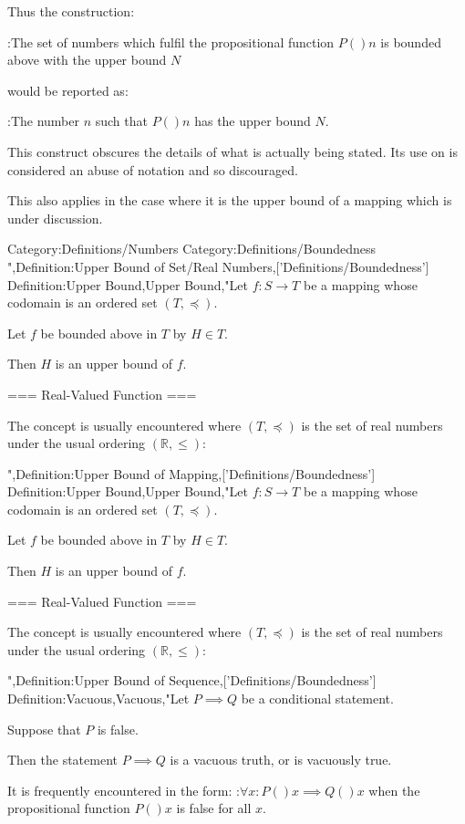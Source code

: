 Thus the construction:

:The set of numbers which fulfil the propositional function $P \left(   \right)n$ is bounded above with the upper bound $N$

would be reported as:

:The number $n$ such that $P \left(   \right)n$ has the upper bound $N$.


This construct obscures the details of what is actually being stated. Its use on  is considered an abuse of notation and so discouraged.


This also applies in the case where it is the upper bound of a mapping which is under discussion.


Category:Definitions/Numbers
Category:Definitions/Boundedness
",Definition:Upper Bound of Set/Real Numbers,['Definitions/Boundedness']
Definition:Upper Bound,Upper Bound,"Let $f: S \to T$ be a mapping whose codomain is an ordered set $\left( T, \preceq \right)$.


Let $f$ be bounded above in $T$ by $H \in T$.


Then $H$ is an upper bound of $f$.


=== Real-Valued Function ===

The concept is usually encountered where $\left( T, \preceq \right)$ is the set of real numbers under the usual ordering $\left( \mathbb R, \le \right)$:

",Definition:Upper Bound of Mapping,['Definitions/Boundedness']
Definition:Upper Bound,Upper Bound,"Let $f: S \to T$ be a mapping whose codomain is an ordered set $\left( T, \preceq \right)$.


Let $f$ be bounded above in $T$ by $H \in T$.


Then $H$ is an upper bound of $f$.


=== Real-Valued Function ===

The concept is usually encountered where $\left( T, \preceq \right)$ is the set of real numbers under the usual ordering $\left( \mathbb R, \le \right)$:


",Definition:Upper Bound of Sequence,['Definitions/Boundedness']
Definition:Vacuous,Vacuous,"Let $P \implies Q$ be a conditional statement.

Suppose that $P$ is false.

Then the statement $P \implies Q$ is a vacuous truth, or is vacuously true.


It is frequently encountered in the form:
:$\forall x: P \left(   \right)x \implies Q \left(   \right)x$
when the propositional function $P \left(   \right)x$ is false for all $x$.

